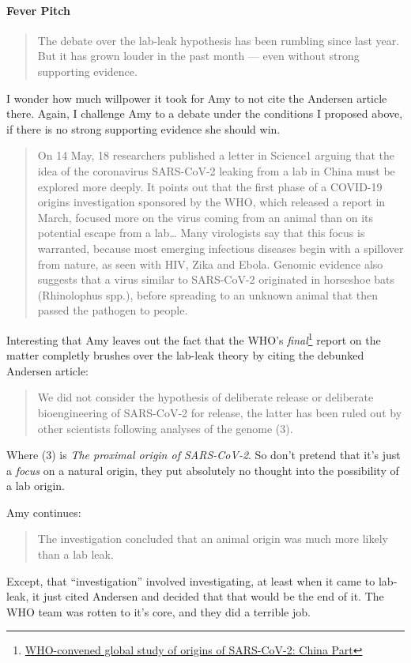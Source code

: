 \documentclass[11pt]{article}
\begin{document}
\paragraph{Fever Pitch}
\label{sec:org055eed5}
\begin{quote}
The debate over the lab-leak hypothesis has been rumbling since last year. But it has grown louder in the past month — even without strong supporting evidence.
\end{quote}
I wonder how much willpower it took for Amy to not cite the Andersen article there. Again, I challenge Amy to a debate under the conditions I proposed above, if there is no strong supporting evidence she should win.

\begin{quote}
On 14 May, 18 researchers published a letter in Science1 arguing that the idea of the coronavirus SARS-CoV-2 leaking from a lab in China must be explored more deeply. It points out that the first phase of a COVID-19 origins investigation sponsored by the WHO, which released a report in March, focused more on the virus coming from an animal than on its potential escape from a lab\ldots{} Many virologists say that this focus is warranted, because most emerging infectious diseases begin with a spillover from nature, as seen with HIV, Zika and Ebola. Genomic evidence also suggests that a virus similar to SARS-CoV-2 originated in horseshoe bats (Rhinolophus spp.), before spreading to an unknown animal that then passed the pathogen to people.
\end{quote}
Interesting that Amy leaves out the fact that the WHO's \emph{final}\footnote{\href{https://www.who.int/publications/i/item/who-convened-global-study-of-origins-of-sars-cov-2-china-part}{WHO-convened global study of origins of SARS-CoV-2: China Part}} report on the matter completly brushes over the lab-leak theory by citing the debunked Andersen article:
\begin{quote}
We did not consider the hypothesis of deliberate release or deliberate bioengineering of SARS-CoV-2 for release, the latter has been ruled out by other scientists following analyses of the genome (3).
\end{quote}
Where (3) is \emph{The proximal origin of SARS-CoV-2}. So don't pretend that it's just a \emph{focus} on a natural origin, they put absolutely no thought into the possibility of a lab origin.

Amy continues:
\begin{quote}
The investigation concluded that an animal origin was much more likely than a lab leak.
\end{quote}
Except, that ``investigation'' involved investigating, at least when it came to lab-leak, it just cited Andersen and decided that that would be the end of it. The WHO team was rotten to it's core, and they did a terrible job.
\end{document}
